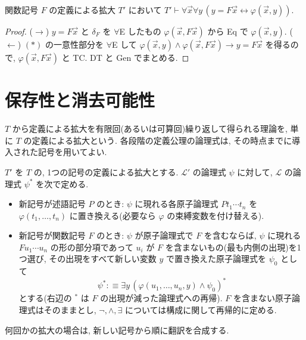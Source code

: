 \begin{lem}\label{lem:func-def-iff}
  関数記号 $F$ の定義による拡大 $T'$ において $T' \vdash \forall \vec{x}\forall y\,(y = F\vec{x} \leftrightarrow \varphi(\vec{x}, y))$.
\end{lem}
\begin{proof}
  ($\to$) $y = F\vec{x}$ と $\delta_F$ を $\forall$E したもの $\varphi(\vec{x}, F\vec{x})$ から Eq で $\varphi(\vec x, y)$. ($\leftarrow$) $(\ast)$ の一意性部分を $\forall$E して $\varphi(\vec x, y) \land \varphi(\vec x, F\vec x) \to y = F\vec x$ を得るので, $\varphi(\vec x, F\vec x)$ と TC. DT と Gen でまとめる.
\end{proof}

\section{保存性と消去可能性}

$T$ から定義による拡大を有限回(あるいは可算回)繰り返して得られる理論を, 単に $T$ の定義による拡大という. 各段階の定義公理の論理式は, その時点までに導入された記号を用いてよい.

\begin{dfn}[翻訳]\label{dfn:translation}
  $T'$ を $T$ の, 1つの記号の定義による拡大とする. $\mathcal{L}'$ の論理式 $\psi$ に対して, $\mathcal{L}$ の論理式 $\psi^\ast$ を次で定める.
  \begin{itemize}
    \item 新記号が述語記号 $P$ のとき: $\psi$ に現れる各原子論理式 $P t_1 \cdots t_n$ を $\varphi(t_1, \ldots, t_n)$ に置き換える(必要なら $\varphi$ の束縛変数を付け替える).
    \item 新記号が関数記号 $F$ のとき: $\psi$ が原子論理式で $F$ を含むならば, $\psi$ に現れる $F u_1 \cdots u_n$ の形の部分項であって $u_i$ が $F$ を含まないもの(最も内側の出現)を1つ選び, その出現をすべて新しい変数 $y$ で置き換えた原子論理式を $\psi_0$ として
    \[ \psi^\ast :\equiv \exists y\,(\varphi(u_1, \ldots, u_n, y) \land \psi_0)^\ast \]
    とする(右辺の $^\ast$ は $F$ の出現が減った論理式への再帰). $F$ を含まない原子論理式はそのままとし, $\neg, \land, \exists$ については構成に関して再帰的に定める.
  \end{itemize}
  何回かの拡大の場合は, 新しい記号から順に翻訳を合成する.
\end{dfn}

